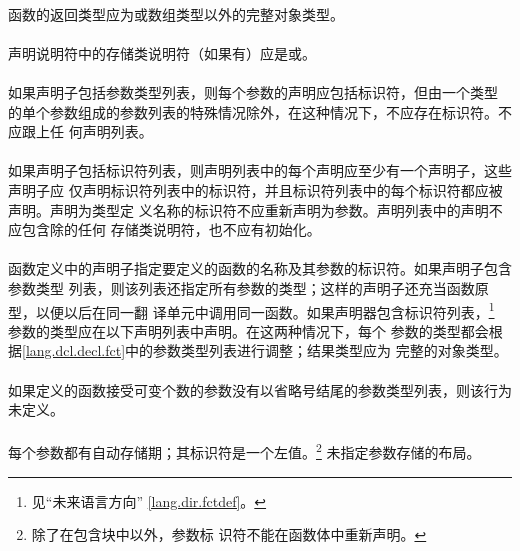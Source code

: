 {\paragraph{}
函数的返回类型应为或数组类型以外的完整对象类型。

\paragraph{}
声明说明符中的存储类说明符（如果有）应是或。

\paragraph{}
如果声明子包括参数类型列表，则每个参数的声明应包括标识符，但由一个类型
的单个参数组成的参数列表的特殊情况除外，在这种情况下，不应存在标识符。不应跟上任
何声明列表。

\paragraph{}
如果声明子包括标识符列表，则声明列表中的每个声明应至少有一个声明子，这些声明子应
仅声明标识符列表中的标识符，并且标识符列表中的每个标识符都应被声明。声明为类型定
义名称的标识符不应重新声明为参数。声明列表中的声明不应包含除的任何
存储类说明符，也不应有初始化。

\semantic
\paragraph{}
函数定义中的声明子指定要定义的函数的名称及其参数的标识符。如果声明子包含参数类型
列表，则该列表还指定所有参数的类型；这样的声明子还充当函数原型，以便以后在同一翻
译单元中调用同一函数。如果声明器包含标识符列表，\footnote{见``未来语言方向''
\ref{lang.dir.fctdef}。} 参数的类型应在以下声明列表中声明。在这两种情况下，每个
参数的类型都会根据\ref{lang.dcl.decl.fct}中的参数类型列表进行调整；结果类型应为
完整的对象类型。

\paragraph{}
如果定义的函数接受可变个数的参数没有以省略号结尾的参数类型列表，则该行为未定义。

\paragraph{}
每个参数都有自动存储期；其标识符是一个左值。\footnote{除了在包含块中以外，参数标
识符不能在函数体中重新声明。} 未指定参数存储的布局。

}
